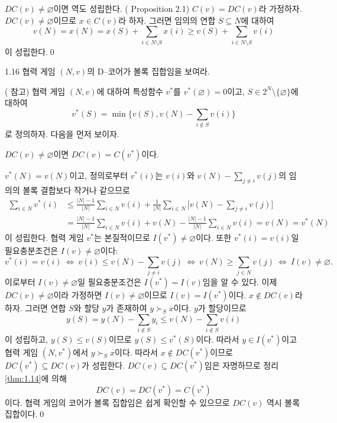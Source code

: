\documentclass{article}
\numberwithin{equation}{section}
\begin{document}
\begin{sol}
	$DC(v)\ne\varnothing$이면 역도 성립한다. (\cite{3} Proposition 2.1) $C(v)=DC(v)$라 가정하자. $DC(v)\ne\varnothing$이므로 $x\in C(v)$라 하자. 그러면 임의의 연합 $S\subseteq N$에 대하여
	\[
		v(N)=x(N)=x(S)+\sum_{i\in N\setminus S}x(i)\geq v(S)+\sum_{i\in N\setminus S}v(i)
	\]
	이 성립한다.\qed
\end{sol}

\begin{prob}{}{1.16}
	협력 게임 $(N,v)$의 D--코어가 볼록 집합임을 보여라.
\end{prob}

\begin{sol}
	(\cite{3} 참고) 협력 게임 $(N,v)$에 대하여 특성함수 $v^*$를 $v^*(\varnothing)=0$이고, $S\in 2^N\setminus\{\varnothing\}$에 대하여
	\[
		v^*(S)=\min\biggl\{v(S),v(N)-\sum_{i\notin S}v(i)\biggr\}
	\]
	로 정의하자. 다음을 먼저 보이자.
	\begin{lemma*}{}{}
		$DC(v)\ne\varnothing$이면 $DC(v)=C(v^*)$이다.
	\end{lemma*}
	$v^*(N)=v(N)$이고, 정의로부터 $v^*(i)$는 $v(i)$와 $v(N)-\sum_{j\ne i}v(j)$의 임의의 볼록 결합보다 작거나 같으므로
	\[
		\begin{aligned}
			\sum_{i\in N}v^*(i)&\leq\frac{\vert N\vert-1}{\vert N\vert}\sum_{i\in N}v(i)+\frac{1}{\vert N\vert}\sum_{i\in N}\biggl[v(N)-\sum_{j\ne i}v(j)\biggr]\\[3pt]
			&=\frac{\vert N\vert-1}{\vert N\vert}\sum_{i\in N}v(i)+v(N)-\frac{\vert N\vert-1}{\vert N\vert}\sum_{i\in N}v(i)=v(N)=v^*(N)
		\end{aligned}
	\]
	이 성립한다. 협력 게임 $v^*$는 본질적이므로 $I(v^*)\ne\varnothing$이다. 또한 $v^*(i)=v(i)$일 필요충분조건은 $I(v)\ne\varnothing$이다:
	\[
		v^*(i)=v(i)~\Longleftrightarrow~v(i)\leq v(N)-\sum_{j\ne i}v(j)~\Longleftrightarrow~v(N)\geq\sum_{j\in N}v(j)~\Longleftrightarrow~I(v)\ne\varnothing.
	\]
	이로부터 $I(v)\ne\varnothing$일 필요충분조건은 $I(v^*)=I(v)$임을 알 수 있다. 이제 $DC(v)\ne\varnothing$이라 가정하면 $I(v)\ne\varnothing$이므로 $I(v)=I(v^*)$이다. $x\notin DC(v)$라 하자. 그러면 연합 $S$와 할당 $y$가 존재하여 $y\succ_Sx$이다. $y$가 할당이므로
	\[
		y(S)=y(N)-\sum_{i\notin S}y_i\leq v(N)-\sum_{i\notin S}v(i)
	\]
	이 성립하고, $y(S)\leq v(S)$이므로 $y(S)\leq v^*(S)$이다. 따라서 $y\in I(v^*)$이고 협력 게임 $(N, v^*)$에서 $y\succ_Sx$이다. 따라서 $x\notin DC(v^*)$이므로 $DC(v^*)\subseteq DC(v)$가 성립한다. $DC(v)\subseteq DC(v^*)$임은 자명하므로 정리 \ref{thm:1.14}에 의해
	\[
		DC(v)=DC(v^*)=C(v^*)
	\]
	이다. 협력 게임의 코어가 볼록 집합임은 쉽게 확인할 수 있으므로 $DC(v)$ 역시 볼록 집합이다.\qed
\end{sol}
\end{document}
